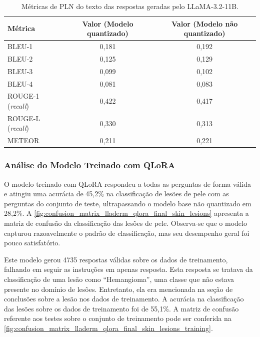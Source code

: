 \begin{table}[ht]
    \caption{\small Métricas de \ac{PLN} do texto das respostas geradas pelo \ac{LLaMA}-3.2-11B.}
    \centering
    \begin{tabular}{l|c|c}
        \hline
        Métrica                        & Valor (Modelo quantizado) & Valor (Modelo não quantizado) \\ \hline
        \ac{BLEU}-1                    & 0,181                     & 0,192                         \\
        \ac{BLEU}-2                    & 0,125                     & 0,129                         \\
        \ac{BLEU}-3                    & 0,099                     & 0,102                         \\
        \ac{BLEU}-4                    & 0,081                     & 0,083                         \\ \hline
        \ac{ROUGE}-1 (\textit{recall}) & 0,422                     & 0,417                         \\
        \ac{ROUGE}-L (\textit{recall}) & 0,330                     & 0,313                         \\ \hline
        \ac{METEOR}                    & 0,211                     & 0,221                         \\ \hline
    \end{tabular}
    \label{tab:llama_nlp_metrics}
\end{table}

\subsubsection{Análise do Modelo Treinado com QLoRA}

O modelo treinado com \ac{QLoRA} respondeu a todas as perguntas de forma válida e atingiu uma acurácia de 45,2\% na
classificação de lesões de pele com as perguntas do conjunto de teste, ultrapassando o modelo base não quantizado
em 28,2\%. A \autoref{fig:confusion_matrix_lladerm_qlora_final_skin_lesions} apresenta a matriz de confusão da
classificação das lesões de pele. Observa-se que o modelo capturou razoavelmente o padrão de classificação, mas seu
desempenho geral foi pouco satisfatório.

Este modelo gerou 4735 respostas válidas sobre os dados de treinamento, falhando em seguir as instruções em apenas
resposta. Esta resposta se tratava da classificação de uma lesão como ``Hemangioma'', uma classe que não estava
presente no domínio de lesões. Entretanto, ela era mencionada na seção de conclusões sobre a lesão nos dados de
treinamento. A acurácia na classificação das lesões sobre os dados de treinamento foi de 55,1\%. A matriz de confusão
referente aos testes sobre o conjunto de treinamento pode ser conferida na
\autoref{fig:confusion_matrix_lladerm_qlora_final_skin_lesions_training}.

